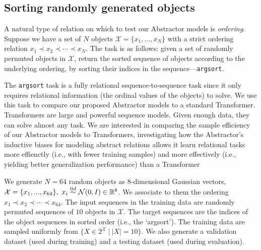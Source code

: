 \subsection{Sorting randomly generated objects}
\label{ssec:random_object_argsort}
\def\subtask#1{\noindent{\it\bfseries #1.}}


A natural type of relation on which to test our Abstractor models is \textit{ordering}. Suppose we have a set of $N$
objects $\mathcal{X} = \{ x_1 , ..., x_N \}$ with a strict ordering relation $x_1 \prec x_2 \prec \cdots \prec x_N$. The task is as follows: given a set of randomly permuted objects in $\mathcal{X}$, return the sorted sequence of objects according to the underlying ordering, by sorting their indices in the sequence---\texttt{argsort}.

The \texttt{argsort} task is a fully relational sequence-to-sequence task since it only requires relational
information (the ordinal values of the objects) to solve. We use this task to compare our proposed Abstractor models
to a standard Transformer.
Transformers are large and powerful sequence models. Given enough data, they can solve almost any task. We are interested in comparing the sample efficiency of our Abstractor models to Transformers, investigating how the Abstractor's
inductive biases for modeling abstract relations allows it
learn relational tasks more effienctly (i.e., with fewer training samples) and more effectively (i.e., yielding
better generalization performance) than a Transformer

\subtask{Random object sorting task} We generate $N=64$ random objects as 8-dimensional Gaussian vectors, $\mathcal{X} = \{ x_1 , ..., x_{64} \}, \ x_i \overset{\mathrm{iid}}{\sim} \mathcal{N}(0, I) \in \mathbb{R}^8$. We associate to them the ordering $x_1 \prec x_2 \prec \cdots \prec x_{64}$. The input sequences in the training data are randomly permuted sequences of $10$ objects in $\mathcal{X}$. The target sequences are the indices of the object sequences in sorted order (i.e., the `argsort'). The training data are sampled uniformly from $\{ X \in 2^\mathcal{X} \ \vert \ |X| = 10\}$. We also generate a validation dataset (used during training) and a testing dataset (used during evaluation).

